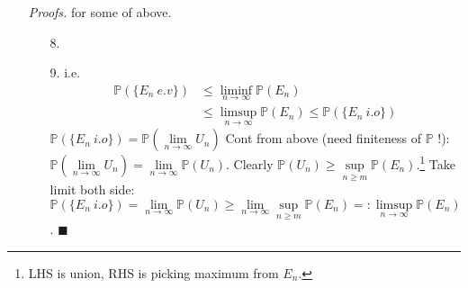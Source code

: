 \documentclass[a4paper,12pt,twoside]{book}
\begin{document}
\begin{itemize}
\begin{itemize}
		\item[] \textbf{Setminus}:
		\item[8.] $(\limsup\limits_{n\rightarrow\infty}E_n)\setminus(\liminf\limits_{n\rightarrow\infty}E_n)=\limsup\limits_{n\rightarrow\infty}(E_n\setminus E_{n+1})$

		\item[]	\textbf{With Measure}:
		\item[9.] $\mathbb{P}(\liminf\limits_{n\rightarrow\infty}E_n)\leq \liminf\limits_{n\rightarrow\infty}\mathbb{P}(E_n)\leq \limsup\limits_{n\rightarrow\infty}\mathbb{P}(E_n)\leq \mathbb{P}(\limsup\limits_{n\rightarrow\infty}E_n)$\footnote{First $\leq$ is Fatou's lemma, third is reverse-Fatou's lemma.}
		\item[10.] If $\lim\limits_{n\rightarrow\infty}E_n=E$, then $\mathbb{P}(\lim\limits_{n\rightarrow\infty}E_n)=\mathbb{P}(E)$.
	\end{itemize}

	\item[\textit{Proofs.}] for some of above.
	\begin{itemize}
		\item[8.]
		\item[9.] i.e.
		\begin{equation}
		\begin{split}
			\mathbb{P}(\{E_n~e.v\}) &\leq \liminf\limits_{n\rightarrow\infty}\mathbb{P}(E_n)\\
			&\leq \limsup\limits_{n\rightarrow\infty}\mathbb{P}(E_n) \leq \mathbb{P}(\{E_n~i.o\})
		\end{split}
		\end{equation}
		$\mathbb{P}(\{E_n~i.o\})=\mathbb{P}(\lim\limits_{n\rightarrow\infty}U_n)$\newline
		Cont from above (need finiteness of $\mathbb{P}$ !): $\mathbb{P}(\lim\limits_{n\rightarrow\infty}U_n)=\lim\limits_{n\rightarrow\infty}\mathbb{P}(U_n)$. \newline
		Clearly $\mathbb{P}(U_n)\geq \sup\limits_{n\geq m}\mathbb{P}(E_n)$.\footnote{LHS is union, RHS is picking maximum from $E_n$.} Take limit both side: \newline
		$\mathbb{P}(\{E_n~i.o\})=\lim\limits_{n\rightarrow\infty}\mathbb{P}(U_n)\geq \lim\limits_{n\rightarrow\infty}\sup\limits_{n\geq m}\mathbb{P}(E_n)=:\limsup\limits_{n\rightarrow\infty}\mathbb{P}(E_n)$. $\blacksquare$
	\end{itemize}
\end{itemize}

\end{document}
